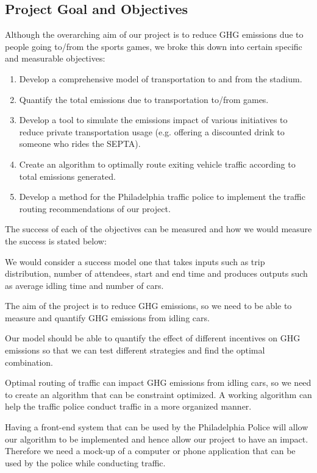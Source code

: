 \documentclass[12pt]{article}
\begin{document}
\subsection{Project Goal and Objectives}
Although the overarching aim of our project is to reduce GHG
emissions due to people going to/from the sports games, we broke this
down into certain specific and measurable objectives:

\begin{enumerate}
    \item Develop a comprehensive model of transportation to and from
  the stadium.
    \item Quantify the total emissions due to transportation to/from
  games.
    \item Develop a tool to simulate the emissions impact of various
  initiatives to reduce private transportation usage (e.g. offering a
  discounted drink to someone who rides the SEPTA).
    \item Create an algorithm to optimally route exiting vehicle traffic
  according to total emissions generated.
    \item Develop a method for the Philadelphia traffic police to
  implement the traffic routing recommendations of our project.
\end{enumerate}

The success of each of the objectives can be measured and how we would
measure the success is stated below:

We would consider a success model one that takes inputs such as trip
distribution, number of attendees, start and end time and produces
outputs such as average idling time and number of cars.

The aim of the project is to reduce GHG emissions, so we need to be
able to measure and quantify GHG emissions from idling cars.

Our model should be able to quantify the effect of different
incentives on GHG emissions so that we can test different
strategies and find the optimal combination.

Optimal routing of traffic can impact GHG emissions from idling
cars, so we need to create an algorithm that can be constraint
optimized. A working algorithm can help the traffic police conduct
traffic in a more organized manner.

Having a front-end system that can be used by the Philadelphia Police
will allow our algorithm to be implemented and hence allow our project
to have an impact. Therefore we need a mock-up of a computer or phone application
that can be used by the police while conducting traffic.
\end{document}
